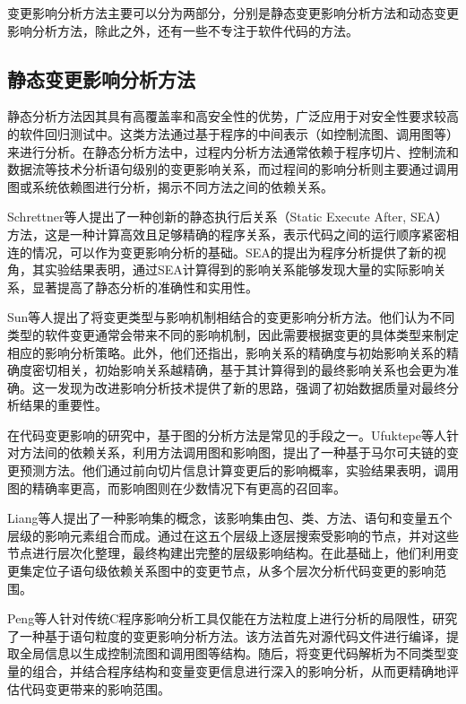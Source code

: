 变更影响分析方法主要可以分为两部分，分别是静态变更影响分析方法和动态变更影响分析方法，除此之外，还有一些不专注于软件代码的方法。


\subsection{静态变更影响分析方法}

静态分析方法因其具有高覆盖率和高安全性的优势，广泛应用于对安全性要求较高的软件回归测试中。这类方法通过基于程序的中间表示（如控制流图、调用图等）来进行分析。在静态分析方法中，过程内分析方法通常依赖于程序切片、控制流和数据流等技术\cite{2004Efficient,1991Using}分析语句级别的变更影响关系，而过程间的影响分析则主要通过调用图或系统依赖图进行分析，揭示不同方法之间的依赖关系\cite{JitenderKumarChhabra2018Improved, 2011An, 2013Analyzing}。

Schrettner等人\cite{Department2013Impact}提出了一种创新的静态执行后关系（Static Execute After, SEA）方法，这是一种计算高效且足够精确的程序关系，表示代码之间的运行顺序紧密相连的情况，可以作为变更影响分析的基础。SEA的提出为程序分析提供了新的视角，其实验结果表明，通过SEA计算得到的影响关系能够发现大量的实际影响关系，显著提高了静态分析的准确性和实用性。

Sun等人\cite{5676283}提出了将变更类型与影响机制相结合的变更影响分析方法。他们认为不同类型的软件变更通常会带来不同的影响机制，因此需要根据变更的具体类型来制定相应的影响分析策略。此外，他们还指出，影响关系的精确度与初始影响关系的精确度密切相关，初始影响关系越精确，基于其计算得到的最终影响关系也会更为准确。这一发现为改进影响分析技术提供了新的思路，强调了初始数据质量对最终分析结果的重要性。

在代码变更影响的研究中，基于图的分析方法是常见的手段之一。Ufuktepe等人\cite{2021Code}针对方法间的依赖关系，利用方法调用图和影响图，提出了一种基于马尔可夫链的变更预测方法。他们通过前向切片信息计算变更后的影响概率，实验结果表明，调用图的精确率更高，而影响图则在少数情况下有更高的召回率。

Liang等人\cite{10430003}提出了一种影响集的概念，该影响集由包、类、方法、语句和变量五个层级的影响元素组合而成。通过在这五个层级上逐层搜索受影响的节点，并对这些节点进行层次化整理，最终构建出完整的层级影响结构。在此基础上，他们利用变更集定位子语句级依赖关系图中的变更节点，从多个层次分析代码变更的影响范围。

Peng等人\cite{2022An}针对传统C程序影响分析工具仅能在方法粒度上进行分析的局限性，研究了一种基于语句粒度的变更影响分析方法。该方法首先对源代码文件进行编译，提取全局信息以生成控制流图和调用图等结构。随后，将变更代码解析为不同类型变量的组合，并结合程序结构和变量变更信息进行深入的影响分析，从而更精确地评估代码变更带来的影响范围。

